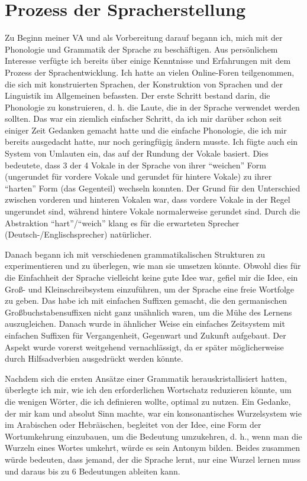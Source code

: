 \documentclass{article}
\begin{document}
\section{Prozess der Spracherstellung}
Zu Beginn meiner VA und als Vorbereitung darauf begann ich, mich mit der Phonologie und Grammatik der Sprache zu beschäftigen.
Aus persönlichem Interesse verfügte ich bereits über einige Kenntnisse und Erfahrungen mit dem Prozess der Sprachentwicklung.
Ich hatte an vielen Online-Foren teilgenommen, die sich mit konstruierten Sprachen, der Konstruktion von Sprachen und der
Linguistik im Allgemeinen befassten. Der erste Schritt bestand darin, die Phonologie zu konstruieren, d. h. die Laute,
die in der Sprache verwendet werden sollten. Das war ein ziemlich einfacher Schritt, da ich mir darüber schon seit einiger
Zeit Gedanken gemacht hatte und die einfache Phonologie, die ich mir bereits ausgedacht hatte, nur noch geringfügig ändern musste.
Ich fügte auch ein System von Umlauten ein, das auf der Rundung der Vokale basiert. Dies bedeutete, dass 3 der 4 Vokale
in der Sprache von ihrer ``weichen'' Form (ungerundet für vordere Vokale und gerundet für hintere Vokale) zu ihrer ``harten'' Form
(das Gegenteil) wechseln konnten. Der Grund für den Unterschied zwischen vorderen und hinteren Vokalen war, dass vordere Vokale
in der Regel ungerundet sind, während hintere Vokale normalerweise gerundet sind.\cite{Stevens72} Durch die Abstraktion
``hart''/``weich'' klang es für die erwarteten Sprecher (Deutsch-/Englischsprecher) natürlicher.

Danach begann ich mit verschiedenen grammatikalischen Strukturen zu experimentieren und zu überlegen,
wie man sie umsetzen könnte. Obwohl dies für die Einfachheit der Sprache vielleicht keine gute Idee war,
gefiel mir die Idee, ein Groß- und Kleinschreibsystem einzuführen, um der Sprache eine freie Wortfolge zu geben.
Das habe ich mit einfachen Suffixen gemacht, die den germanischen Großbuchstabensuffixen nicht ganz unähnlich waren,
um die Mühe des Lernens auszugleichen. Danach wurde in ähnlicher Weise ein einfaches Zeitsystem mit einfachen Suffixen
für Vergangenheit, Gegenwart und Zukunft aufgebaut. Der Aspekt wurde vorerst weitgehend vernachlässigt, da er später
möglicherweise durch Hilfsadverbien ausgedrückt werden könnte.

Nachdem sich die ersten Ansätze einer Grammatik herauskristallisiert hatten, überlegte ich mir,
wie ich den erforderlichen Wortschatz reduzieren könnte, um die wenigen Wörter, die ich definieren wollte,
optimal zu nutzen. Ein Gedanke, der mir kam und absolut Sinn machte, war ein konsonantisches Wurzelsystem wie im Arabischen
oder Hebräischen, begleitet von der Idee, eine Form der Wortumkehrung einzubauen, um die Bedeutung umzukehren, d. h.,
wenn man die Wurzeln eines Wortes umkehrt, würde es sein Antonym bilden. Beides zusammen würde bedeuten, dass jemand,
der die Sprache lernt, nur eine Wurzel lernen muss und daraus bis zu 6 Bedeutungen ableiten kann.
\end{document}
